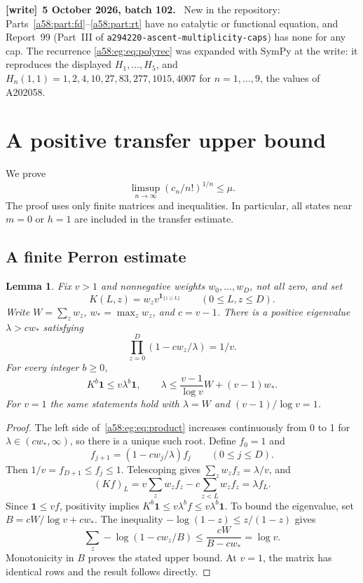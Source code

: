 \documentclass[11pt,letterpaper]{article}
\newcommand{\file}[1]{\nolinkurl{#1}}
\newtheorem{lemma}[theorem]{Lemma}
\theoremstyle{remark}
\newcommand{\ind}[1]{\mathbf1_{\{#1\}}}
\newcommand{\muval}{\mu}
\newenvironment{writenote}[1][]{\par\smallskip\begingroup\small
 \noindent\textbf{[write]}\if\relax\detokenize{#1}\relax\else~\textbf{#1.}\fi\ }%
 {\par\endgroup\smallskip}
\begin{document}
\begin{writenote}[5 October 2026, batch 102]
New in the repository: Parts~\ref{a58:part:fd}--\ref{a58:part:rt} have no catalytic or functional equation, and Report~99 (Part~III of \file{a294220-ascent-multiplicity-caps}) has none for any cap. The recurrence \eqref{a58:eg:eq:polyrec} was expanded with SymPy at the write: it reproduces the displayed $H_1,\ldots,H_5$, and $H_n(1,1)=1,2,4,10,27,83,277,1015,4007$ for $n=1,\ldots,9$, the values of A202058.
\end{writenote}

\section{A positive transfer upper bound}\label{a58:eg:sec:upper}
We prove
\begin{equation}\label{a58:eg:eq:upperclaim}
 \limsup_{n\to\infty}(c_n/n!)^{1/n}\le\muval.
\end{equation}
The proof uses only finite matrices and inequalities. In particular, all states near $m=0$ or $h=1$ are included in the transfer estimate.

\subsection{A finite Perron estimate}
\begin{lemma}\label{a58:eg:lem:perron}
Fix $v>1$ and nonnegative weights $w_0,\ldots,w_D$, not all zero, and set
\[
 K(L,z)=w_zv^{\ind{z\ge L}}\qquad(0\le L,z\le D).
\]
Write $W=\sum_z w_z$, $w_*=\max_z w_z$, and $c=v-1$. There is a positive eigenvalue $\lambda>cw_*$ satisfying
\begin{equation}\label{a58:eg:eq:product}
 \prod_{z=0}^D(1-cw_z/\lambda)=1/v.
\end{equation}
For every integer $b\ge0$,
\begin{equation}\label{a58:eg:eq:matrixbound}
 K^b\boldsymbol1\le v\lambda^b\boldsymbol1,
 \qquad
 \lambda\le\frac{v-1}{\log v}W+(v-1)w_*.
\end{equation}
For $v=1$ the same statements hold with $\lambda=W$ and $(v-1)/\log v=1$.
\end{lemma}
\begin{proof}
The left side of~\eqref{a58:eg:eq:product} increases continuously from 0 to 1 for $\lambda\in(cw_*,\infty)$, so there is a unique such root. Define $f_0=1$ and
\[
 f_{j+1}=(1-cw_j/\lambda)f_j\qquad(0\le j\le D).
\]
Then $1/v=f_{D+1}\le f_j\le1$. Telescoping gives $\sum_z w_zf_z=\lambda/v$, and
\[
 (Kf)_L=v\sum_z w_zf_z-c\sum_{z<L}w_zf_z=\lambda f_L.
\]
Since $\boldsymbol1\le vf$, positivity implies
$K^b\boldsymbol1\le v\lambda^bf\le v\lambda^b\boldsymbol1$.
To bound the eigenvalue, set $B=cW/\log v+cw_*$. The inequality
$-\log(1-z)\le z/(1-z)$ gives
\[
 \sum_z-\log(1-cw_z/B)
 \le\frac{cW}{B-cw_*}=\log v.
\]
Monotonicity in $B$ proves the stated upper bound. At $v=1$, the matrix has identical rows and the result follows directly.
\end{proof}
\end{document}
